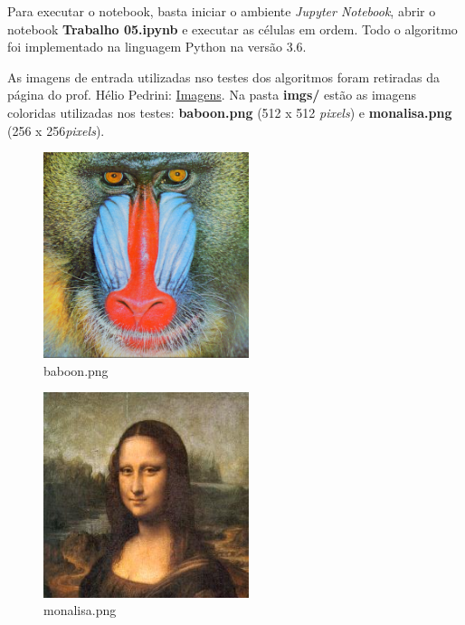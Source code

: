 \documentclass[twoside,twocolumn]{article}
\begin{document}
Para executar o notebook, basta iniciar o ambiente \textit{Jupyter Notebook}, abrir o notebook \textbf{Trabalho 05.ipynb} e executar as células em ordem. Todo o algoritmo foi implementado na linguagem Python na versão 3.6.

As imagens de entrada utilizadas nso testes dos algoritmos foram retiradas da página do prof. Hélio Pedrini: \href{http://www.ic.unicamp.br/~helio/imagens_coloridas/}{Imagens}. Na pasta \textbf{imgs/} estão as imagens coloridas utilizadas nos testes: \textbf{baboon.png} (512 x 512 \textit{pixels}) e \textbf{monalisa.png} (256 x 256\textit{pixels}).

\begin{figure}[H]
\begin{center}
	\includegraphics[height=6cm]{figures/baboon.png}
\caption{baboon.png} \label{baboon}
\end{center}
\end{figure}

\begin{figure}[H]
\begin{center}
	\includegraphics[height=6cm]{figures/monalisa.png}
\caption{monalisa.png} \label{monalisa}
\end{center}
\end{figure}

\end{document}
